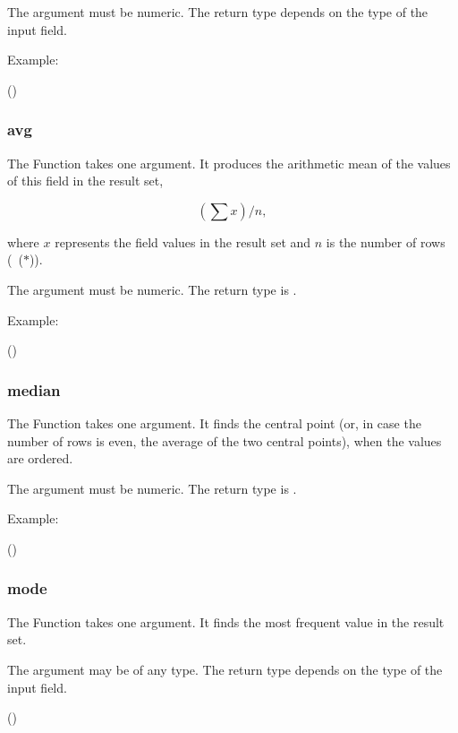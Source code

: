 The argument must be numeric.
The return type depends on the type of the input field.

Example:

 ()
 

\subsubsection{avg}
The Function takes one argument.
It produces the arithmetic mean of the values
of this field in the result set, \ie

\[
\left(\sum{x}\right)/n,
\]

where $x$ represents the
field values in the result set and $n$
is the number of rows (\ie\ ($\ast$)).

The argument must be numeric.
The return type is .

Example:

 ()
 

\subsubsection{median}
The Function takes one argument.
It finds the central point (or, in case
the number of rows is even, the average
of the two central points), when the values are ordered.

The argument must be numeric.
The return type is .

Example:

 ()
 


\subsubsection{mode}
The Function takes one argument.
It finds the most frequent value in the result set.

The argument may be of any type.
The return type depends on the type of the input field.

 ()
 

